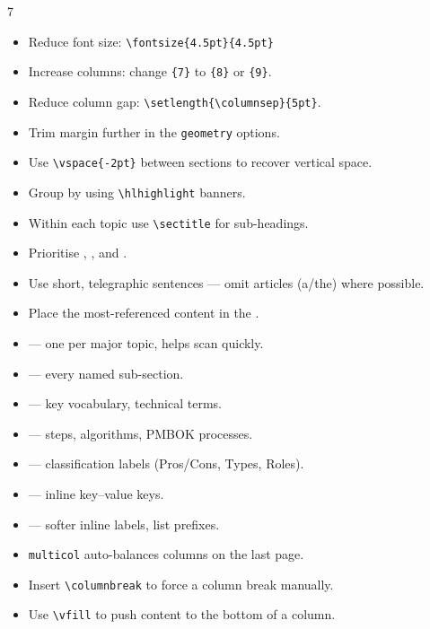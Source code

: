 \documentclass[a4paper,landscape]{article}
\begin{document}
\begin{multicols}{7}
\begin{itemize}
\item Reduce font size: \texttt{\textbackslash fontsize\{4.5pt\}\{4.5pt\}}
\item Increase columns: change \texttt{\{7\}} to \texttt{\{8\}} or \texttt{\{9\}}.
\item Reduce column gap: \texttt{\textbackslash setlength\{\textbackslash columnsep\}\{5pt\}}.
\item Trim margin further in the \texttt{geometry} options.
\item Use \texttt{\textbackslash vspace\{-2pt\}} between sections to recover vertical space.
\end{itemize}

\begin{itemize}
\item Group by  using \texttt{\textbackslash hlhighlight} banners.
\item Within each topic use \texttt{\textbackslash sectitle} for sub-headings.
\item Prioritise , , and .
\item Use short, telegraphic sentences — omit articles (a/the) where possible.
\item Place the most-referenced content in the .
\end{itemize}

\begin{itemize}
\item {} — one per major topic, helps scan quickly.
\item {} — every named sub-section.
\item {} — key vocabulary, technical terms.
\item {} — steps, algorithms, PMBOK processes.
\item {} — classification labels (Pros/Cons, Types, Roles).
\item {} — inline key–value keys.
\item {} — softer inline labels, list prefixes.
\end{itemize}

\begin{itemize}
\item \texttt{multicol} auto-balances columns on the last page.
\item Insert \texttt{\textbackslash columnbreak} to force a column break manually.
\item Use \texttt{\textbackslash vfill} to push content to the bottom of a column.
\end{itemize}


\end{multicols}
\end{document}

